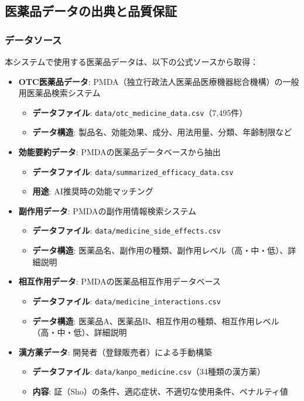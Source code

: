 \documentclass[a4paper,11pt,ja=standard,xelatex]{bxjsarticle}
\theoremstyle{definition}
\begin{document}
\subsection{医薬品データの出典と品質保証}

\subsubsection{データソース}

本システムで使用する医薬品データは、以下の公式ソースから取得：

\begin{itemize}
\item \textbf{OTC医薬品データ}: PMDA（独立行政法人医薬品医療機器総合機構）の一般用医薬品検索システム
  \begin{itemize}
  \item \textbf{データファイル}: \texttt{data/otc\_medicine\_data.csv}（7,495件）
  \item \textbf{データ構造}: 製品名、効能効果、成分、用法用量、分類、年齢制限など
  \end{itemize}
\item \textbf{効能要約データ}: PMDAの医薬品データベースから抽出
  \begin{itemize}
  \item \textbf{データファイル}: \texttt{data/summarized\_efficacy\_data.csv}
  \item \textbf{用途}: AI推奨時の効能マッチング
  \end{itemize}
\item \textbf{副作用データ}: PMDAの副作用情報検索システム
  \begin{itemize}
  \item \textbf{データファイル}: \texttt{data/medicine\_side\_effects.csv}
  \item \textbf{データ構造}: 医薬品名、副作用の種類、副作用レベル（高・中・低）、詳細説明
  \end{itemize}
\item \textbf{相互作用データ}: PMDAの医薬品相互作用データベース
  \begin{itemize}
  \item \textbf{データファイル}: \texttt{data/medicine\_interactions.csv}
  \item \textbf{データ構造}: 医薬品A、医薬品B、相互作用の種類、相互作用レベル（高・中・低）、詳細説明
  \end{itemize}
\item \textbf{漢方薬データ}: 開発者（登録販売者）による手動構築
  \begin{itemize}
  \item \textbf{データファイル}: \texttt{data/kanpo\_medicine.csv}（34種類の漢方薬）
  \item \textbf{内容}: 証（Sho）の条件、適応症状、不適切な使用条件、ペナルティ値
  \end{itemize}
\end{itemize}
\end{document}
